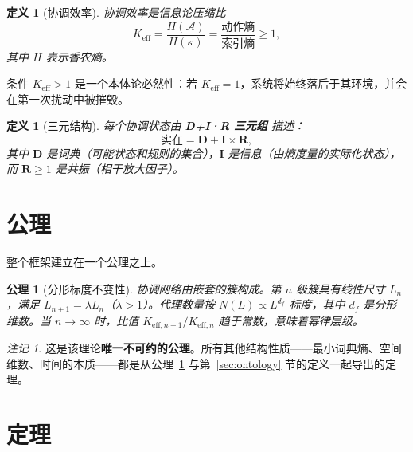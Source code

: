 \documentclass[12pt,a4paper]{article}
\newtheorem{axiom}[theorem]{公理}
\newtheorem{definition}[theorem]{定义}
\theoremstyle{remark}
\newtheorem{remark}[theorem]{注记}
\newcommand{\Keff}{K_{\mathrm{eff}}}
\begin{document}
	\begin{definition}[协调效率]
		协调效率是信息论压缩比
		\begin{equation}
			\Keff = \frac{H(\mathcal{A})}{H(\kappa)} = \frac{\text{动作熵}}{\text{索引熵}} \ge 1,
			\label{eq:keff}
		\end{equation}
		其中 \(H\) 表示香农熵。
	\end{definition}
	
	条件 \(K_{\mathrm{eff}} > 1\) 是一个本体论必然性：若 \(K_{\mathrm{eff}} = 1\)，系统将始终落后于其环境，并会在第一次扰动中被摧毁。
	
	\begin{definition}[三元结构]
		每个协调状态由 \textbf{D+I·R 三元组} 描述：
		\[
		\text{实在} = \mathbf{D} + \mathbf{I} \times \mathbf{R},
		\]
		其中 \(\mathbf{D}\) 是词典（可能状态和规则的集合），\(\mathbf{I}\) 是信息（由熵度量的实际化状态），而 \(\mathbf{R} \ge 1\) 是共振（相干放大因子）。
	\end{definition}
	
	\section{公理}
	\label{sec:axioms}
	
	整个框架建立在一个公理之上。
	
	\begin{axiom}[分形标度不变性]
		\label{ax:A1}
		协调网络由嵌套的簇构成。第 \(n\) 级簇具有线性尺寸 \(L_n\)，满足 \(L_{n+1} = \lambda L_n\)（\(\lambda > 1\)）。代理数量按 \(N(L) \propto L^{d_f}\) 标度，其中 \(d_f\) 是分形维数。当 \(n \to \infty\) 时，比值 \(K_{\mathrm{eff},n+1}/K_{\mathrm{eff},n}\) 趋于常数，意味着幂律层级。
	\end{axiom}
	
	\begin{remark}
		这是该理论\textbf{唯一不可约的公理}。所有其他结构性质——最小词典熵、空间维数、时间的本质——都是从公理~\ref{ax:A1} 与第~\ref{sec:ontology} 节的定义一起导出的定理。
	\end{remark}
	
	\section{定理}
	\label{sec:theorems}
	
\end{document}
